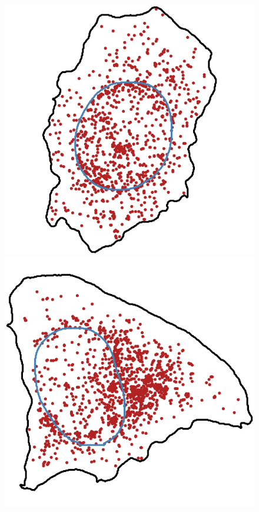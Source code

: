 \begin{figure}[]
	\endminipage\hfill
		\includegraphics[width=\linewidth]{figures/introduction/real_coord_nuclear_edge}
	\endminipage\hfill
		\includegraphics[width=\linewidth]{figures/introduction/real_coord_perinuclear}

\end{figure}
